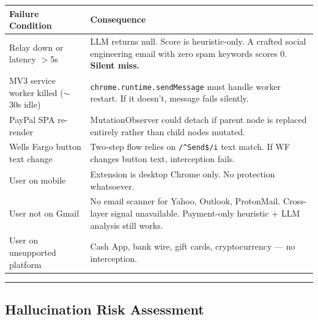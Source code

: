 \documentclass[11pt, letterpaper]{article}
\begin{document}
  \begin{longtable}{p{4cm} p{9cm}}
  \toprule
  \textbf{Failure Condition} & \textbf{Consequence} \\
  \midrule
  Relay down or latency $>$5s & LLM returns null. Score is heuristic-only. A crafted social engineering email with zero spam keywords scores 0. \textbf{Silent miss.} \\
  \midrule
  MV3 service worker killed ($\sim$30s idle) & \texttt{chrome.runtime.sendMessage} must handle worker restart. If it doesn't, message fails silently. \\
  \midrule
  PayPal SPA re-render & MutationObserver could detach if parent node is replaced entirely rather than child nodes mutated. \\
  \midrule
  Wells Fargo button text change & Two-step flow relies on \texttt{/\^{}Send\$/i} text match. If WF changes button text, interception fails. \\
  \midrule
  User on mobile & Extension is desktop Chrome only. No protection whatsoever. \\
  \midrule
  User not on Gmail & No email scanner for Yahoo, Outlook, ProtonMail. Cross-layer signal unavailable. Payment-only heuristic + LLM analysis still works. \\
  \midrule
  User on unsupported platform & Cash App, bank wire, gift cards, cryptocurrency --- no interception. \\
  \bottomrule
  \end{longtable}

  \vspace{12pt}
  \hrule
  \vspace{12pt}

  \subsection{Hallucination Risk Assessment}
\end{document}
